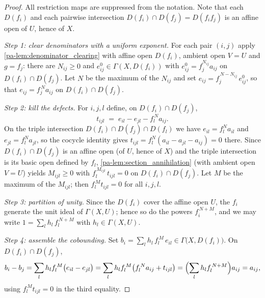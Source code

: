 \begin{proof}
  \leanok
  All restriction maps are suppressed from the notation. Note that each \(D(f_i)\) and each
  pairwise intersection \(D(f_i) \cap D(f_j) = D(f_i f_j)\) is an affine open of \(U\), hence
  of \(X\).

  \emph{Step 1: clear denominators with a uniform exponent.} For each pair \((i,j)\) apply
  \ref{pa-lem:denominator_clearing} with affine open \(D(f_i)\), ambient open \(V = U\) and
  \(g = f_j\): there are \(N_{ij} \ge 0\) and \(e^0_{ij} \in \Gamma(X, D(f_i))\) with
  \(e^0_{ij} = f_j^{N_{ij}} a_{ij}\) on \(D(f_i) \cap D(f_j)\). Let \(N\) be the maximum of
  the \(N_{ij}\) and set \(e_{ij} = f_j^{\,N - N_{ij}}\, e^0_{ij}\), so that
  \(e_{ij} = f_j^{\,N} a_{ij}\) on \(D(f_i) \cap D(f_j)\).

  \emph{Step 2: kill the defects.} For \(i, j, l\) define, on \(D(f_i) \cap D(f_j)\),
  \[
    t_{ijl} \;=\; e_{il} - e_{jl} - f_l^{\,N} a_{ij}.
  \]
  On the triple intersection \(D(f_i) \cap D(f_j) \cap D(f_l)\) we have
  \(e_{il} = f_l^N a_{il}\) and \(e_{jl} = f_l^N a_{jl}\), so the cocycle identity gives
  \(t_{ijl} = f_l^N (a_{il} - a_{jl} - a_{ij}) = 0\) there. Since
  \(D(f_i) \cap D(f_j)\) is an affine open (of \(U\), hence of \(X\)) and the triple
  intersection is its basic open defined by \(f_l\), \ref{pa-lem:section_annihilation} (with
  ambient open \(V = U\)) yields \(M_{ijl} \ge 0\) with
  \(f_l^{\,M_{ijl}}\, t_{ijl} = 0\) on \(D(f_i) \cap D(f_j)\). Let \(M\) be the maximum of
  the \(M_{ijl}\); then \(f_l^{\,M} t_{ijl} = 0\) for all \(i,j,l\).

  \emph{Step 3: partition of unity.} Since the \(D(f_i)\) cover the affine open \(U\), the
  \(f_i\) generate the unit ideal of \(\Gamma(X, U)\); hence so do the powers
  \(f_i^{\,N+M}\), and we may write \(1 = \sum_l h_l\, f_l^{\,N+M}\) with
  \(h_l \in \Gamma(X, U)\).

  \emph{Step 4: assemble the cobounding.} Set
  \(b_i = \sum_l h_l\, f_l^{\,M}\, e_{il} \in \Gamma\bigl(X, D(f_i)\bigr)\). On
  \(D(f_i) \cap D(f_j)\),
  \[
    b_i - b_j
      = \sum_l h_l f_l^{\,M} \bigl(e_{il} - e_{jl}\bigr)
      = \sum_l h_l f_l^{\,M} \bigl(f_l^{\,N} a_{ij} + t_{ijl}\bigr)
      = \Bigl(\sum_l h_l f_l^{\,N+M}\Bigr) a_{ij}
      = a_{ij},
  \]
  using \(f_l^{\,M} t_{ijl} = 0\) in the third equality.
\end{proof}

